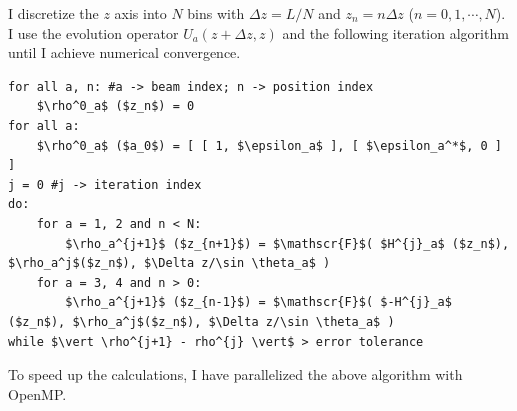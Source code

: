 I discretize the $z$ axis into $N$ bins with $\Delta z = L/N$ and $z_n=n \Delta z$ ($n=0,1,\cdots, N$). I use the evolution operator $U_a(z+\Delta z, z)$ and the following iteration algorithm until I achieve numerical convergence.
\begin{lstlisting}[mathescape]
for all a, n: #a -> beam index; n -> position index
    $\rho^0_a$ ($z_n$) = 0
for all a:
    $\rho^0_a$ ($a_0$) = [ [ 1, $\epsilon_a$ ], [ $\epsilon_a^*$, 0 ] ]
j = 0 #j -> iteration index
do:
    for a = 1, 2 and n < N:
        $\rho_a^{j+1}$ ($z_{n+1}$) = $\mathscr{F}$( $H^{j}_a$ ($z_n$), $\rho_a^j$($z_n$), $\Delta z/\sin \theta_a$ )
    for a = 3, 4 and n > 0:
        $\rho_a^{j+1}$ ($z_{n-1}$) = $\mathscr{F}$( $-H^{j}_a$ ($z_n$), $\rho_a^j$($z_n$), $\Delta z/\sin \theta_a$ )
while $\vert \rho^{j+1} - rho^{j} \vert$ > error tolerance
\end{lstlisting}
To speed up the calculations, I have parallelized the above algorithm with OpenMP.




